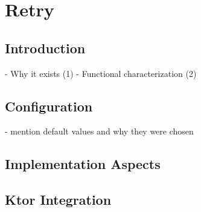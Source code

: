 \chapter{Retry}\label{ch:retry}


\section{Introduction}\label{sec:retry-introduction}

- Why it exists (1)
- Functional characterization (2)


\section{Configuration}\label{sec:retry-configuration}

- mention default values and why they were chosen


\section{Implementation Aspects}\label{sec:retry-implementation-aspects}


\section{Ktor Integration}\label{sec:retry-ktor-integration}
